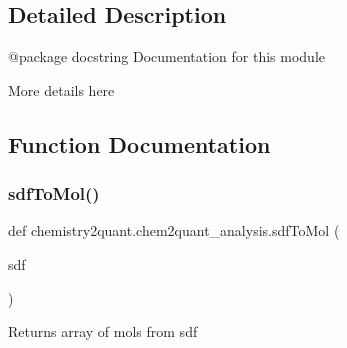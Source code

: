 \subsection{Detailed Description}
\begin{DoxyVerb}@package docstring 
Documentation for this module

More details here \end{DoxyVerb}
 

\subsection{Function Documentation}
\mbox{\label{namespacechemistry2quant_1_1chem2quant__analysis_a5c890927e4c20980765efaff0db0c04a}} 
\subsubsection{\texorpdfstring{sdf\+To\+Mol()}{sdfToMol()}}
{\footnotesize\ttfamily def chemistry2quant.\+chem2quant\+\_\+analysis.\+sdf\+To\+Mol (\begin{DoxyParamCaption}\item[{}]{sdf }\end{DoxyParamCaption})}

\begin{DoxyVerb}Returns array of mols from sdf
\end{DoxyVerb}
 